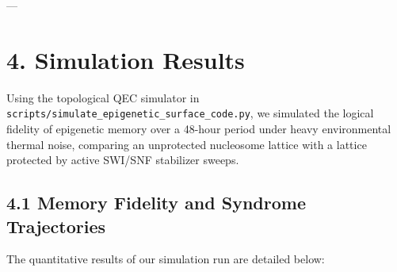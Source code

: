 \documentclass[11pt,twocolumn]{article}
\begin{document}
---

\section{4. Simulation Results}
Using the topological QEC simulator in \texttt{scripts/simulate_epigenetic_surface_code.py}, we simulated the logical fidelity of epigenetic memory over a 48-hour period under heavy environmental thermal noise, comparing an unprotected nucleosome lattice with a lattice protected by active SWI/SNF stabilizer sweeps.

\subsection{4.1 Memory Fidelity and Syndrome Trajectories}
The quantitative results of our simulation run are detailed below:
\end{document}
